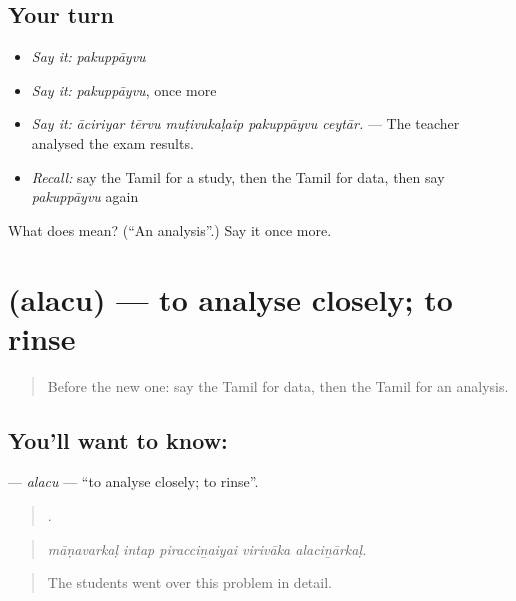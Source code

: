 \subsection*{Your turn}
\begin{itemize}
\raggedright
  \item \emph{Say it:} \emph{pakuppāyvu}
  \item \emph{Say it:} \emph{pakuppāyvu}, once more
  \item \emph{Say it:} \emph{āciriyar tērvu muṭivukaḷaip pakuppāyvu ceytār.} — The teacher analysed the exam results.
  \item \emph{Recall:} say the Tamil for a study, then the Tamil for data, then say \emph{pakuppāyvu} again
\end{itemize}

\begin{tcolorbox}[breakable,colback=teal!4,colframe=teal!35!black,title={Before you move on}]
What does  mean? (\textquotedblleft{}An analysis\textquotedblright{}.) Say it once more.
\end{tcolorbox}
\section[\texorpdfstring{\ta{அலசு} (alacu)}{அலசு (alacu)}]{ (alacu) — to analyse closely; to rinse}

\label{lesson:TA-C362-alacu}



\begin{quote}
Before the new one: say the Tamil for data, then the Tamil for an analysis.
\end{quote}

\subsection*{You'll want to know: }
\textbf{} — \emph{alacu} — \textquotedblleft{}to analyse closely; to rinse\textquotedblright{}.

\begin{quote}
    .
\end{quote}

\begin{quote}
\emph{māṇavarkaḷ intap piracciṉaiyai virivāka alaciṉārkaḷ.}
\end{quote}

\begin{quote}
The students went over this problem in detail.
\end{quote}

